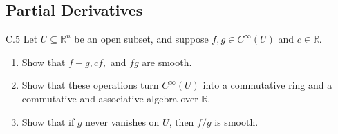\subsection{Partial Derivatives}

\begin{exercise}{C.5}
    Let \( U \subseteq \mathbb{R}^{n} \) be an open subset, and suppose \( f, g \in C^{\infty}(U) \) and \( c \in \mathbb{R} \).
    \begin{enumerate}[itemsep=0pt,label={(\alph*)}]
        \item Show that \( f + g, c f, \) and \( fg \) are smooth.
        \item Show that these operations turn \( C^{\infty}(U) \) into a commutative ring and a commutative and associative algebra over \( \mathbb{R} \).
        \item Show that if \( g \) never vanishes on \( U \), then \( f/g \) is smooth.
    \end{enumerate}
\end{exercise}

